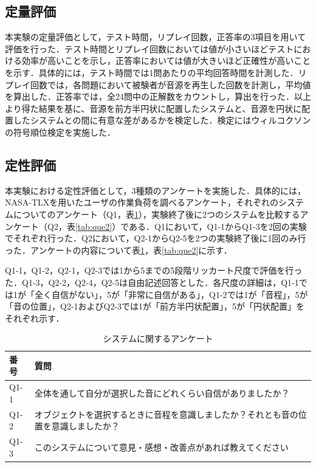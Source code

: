 \subsection{定量評価}
本実験の定量評価として，テスト時間，リプレイ回数，正答率の3項目を用いて評価を行った．テスト時間とリプレイ回数においては値が小さいほどテストにおける効率が高いことを示し，正答率においては値が大きいほど正確性が高いことを示す．具体的には，テスト時間では1問あたりの平均回答時間を計測した．リプレイ回数では，各問題において被験者が音源を再生した回数を計測し，平均値を算出した．正答率では，全24問中の正解数をカウントし，算出を行った．以上より得た結果を基に、音源を前方半円状に配置したシステムと、音源を円状に配置したシステムとの間に有意な差があるかを検定した．検定にはウィルコクソンの符号順位検定を実施した．

\subsection{定性評価}
本実験における定性評価として，3種類のアンケートを実施した．具体的には，NASA-TLXを用いたユーザの作業負荷\cite{芳賀繁1996日本語版}を調べるアンケート，それぞれのシステムについてのアンケート（Q1，表\ref{tab:que1}），実験終了後に2つのシステムを比較するアンケート（Q2，表\ref{tab:que2}）である．Q1において，Q1-1からQ1-3を2回の実験でそれぞれ行った．Q2において，Q2-1からQ2-5を2つの実験終了後に1回のみ行った．アンケートの内容について表\ref{tab:que1}，表\ref{tab:que2}に示す．

Q1-1，Q1-2，Q2-1，Q2-3では1から5までの5段階リッカート尺度で評価を行った．Q1-3，Q2-2，Q2-4，Q2-5は自由記述回答とした．各尺度の詳細は，Q1-1では1が「全く自信がない」，5が「非常に自信がある」，Q1-2では1が「音程」，5が「音の位置」，Q2-1およびQ2-3では1が「前方半円状配置」，5が「円状配置」をそれぞれ示す．

\begin{table}[H]\centering 
    \caption{システムに関するアンケート}\label{tab:que1}
    \begin{tabular}{ll} \hline
    番号 & 質問 \\ \hline
    Q1-1 & 全体を通して自分が選択した音にどれくらい自信がありましたか？ \\
    Q1-2 & オブジェクトを選択するときに音程を意識しましたか？それとも音の位置を意識しましたか？ \\
    Q1-3 & このシステムについて意見・感想・改善点があれば教えてください \\ \hline
    \end{tabular}
\end{table}

